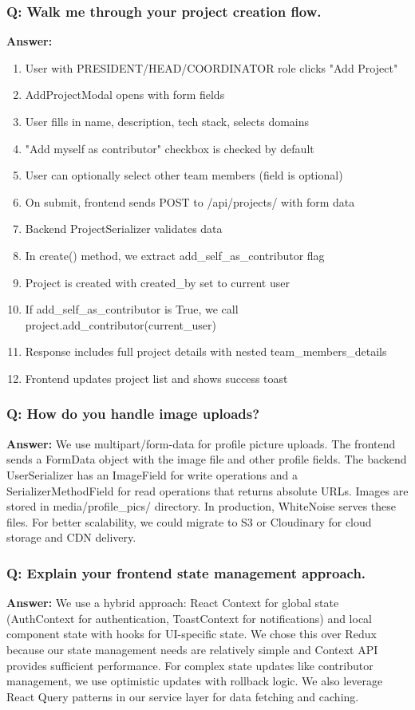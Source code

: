 \documentclass[11pt,a4paper]{article}
\begin{document}
\subsubsection{Q: Walk me through your project creation flow.}
\textbf{Answer:} 
\begin{enumerate}[leftmargin=*]
    \item User with PRESIDENT/HEAD/COORDINATOR role clicks "Add Project"
    \item AddProjectModal opens with form fields
    \item User fills in name, description, tech stack, selects domains
    \item "Add myself as contributor" checkbox is checked by default
    \item User can optionally select other team members (field is optional)
    \item On submit, frontend sends POST to /api/projects/ with form data
    \item Backend ProjectSerializer validates data
    \item In create() method, we extract add\_self\_as\_contributor flag
    \item Project is created with created\_by set to current user
    \item If add\_self\_as\_contributor is True, we call project.add\_contributor(current\_user)
    \item Response includes full project details with nested team\_members\_details
    \item Frontend updates project list and shows success toast
\end{enumerate}

\subsubsection{Q: How do you handle image uploads?}
\textbf{Answer:} We use multipart/form-data for profile picture uploads. The frontend sends a FormData object with the image file and other profile fields. The backend UserSerializer has an ImageField for write operations and a SerializerMethodField for read operations that returns absolute URLs. Images are stored in media/profile\_pics/ directory. In production, WhiteNoise serves these files. For better scalability, we could migrate to S3 or Cloudinary for cloud storage and CDN delivery.

\subsubsection{Q: Explain your frontend state management approach.}
\textbf{Answer:} We use a hybrid approach: React Context for global state (AuthContext for authentication, ToastContext for notifications) and local component state with hooks for UI-specific state. We chose this over Redux because our state management needs are relatively simple and Context API provides sufficient performance. For complex state updates like contributor management, we use optimistic updates with rollback logic. We also leverage React Query patterns in our service layer for data fetching and caching.
\end{document}
